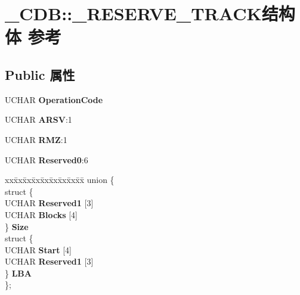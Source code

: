 \hypertarget{struct___c_d_b_1_1___r_e_s_e_r_v_e___t_r_a_c_k}{}\section{\+\_\+\+C\+DB\+:\+:\+\_\+\+R\+E\+S\+E\+R\+V\+E\+\_\+\+T\+R\+A\+C\+K结构体 参考}
\label{struct___c_d_b_1_1___r_e_s_e_r_v_e___t_r_a_c_k}
\subsection*{Public 属性}
\begin{DoxyCompactItemize}
\item 
\mbox{\label{struct___c_d_b_1_1___r_e_s_e_r_v_e___t_r_a_c_k_a28dfc2e102650c43b364a4b625812e8b}} 
U\+C\+H\+AR {\bfseries Operation\+Code}
\item 
\mbox{\label{struct___c_d_b_1_1___r_e_s_e_r_v_e___t_r_a_c_k_a8ea8c9faed4b73d41a1c1a0c57fa1e5c}} 
U\+C\+H\+AR {\bfseries A\+R\+SV}\+:1
\item 
\mbox{\label{struct___c_d_b_1_1___r_e_s_e_r_v_e___t_r_a_c_k_ae0025026304698f3b9cfc13ff8673aa6}} 
U\+C\+H\+AR {\bfseries R\+MZ}\+:1
\item 
\mbox{\label{struct___c_d_b_1_1___r_e_s_e_r_v_e___t_r_a_c_k_a8b643c2ccdd1ee19d7159e5b6f679687}} 
U\+C\+H\+AR {\bfseries Reserved0}\+:6
\item 
\mbox{\label{struct___c_d_b_1_1___r_e_s_e_r_v_e___t_r_a_c_k_a812cc558cef9899d5a393271e4c4f33d}} 
\begin{tabbing}
xx\=xx\=xx\=xx\=xx\=xx\=xx\=xx\=xx\=\kill
union \{\\
\>struct \{\\
\>\>UCHAR {\bfseries Reserved1} \mbox{[}3\mbox{]}\\
\>\>UCHAR {\bfseries Blocks} \mbox{[}4\mbox{]}\\
\>\} {\bfseries Size}\\
\>struct \{\\
\>\>UCHAR {\bfseries Start} \mbox{[}4\mbox{]}\\
\>\>UCHAR {\bfseries Reserved1} \mbox{[}3\mbox{]}\\
\>\} {\bfseries LBA}\\
\}; \\


\end{tabbing}
\end{DoxyCompactItemize}
